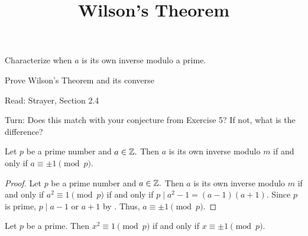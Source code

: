 \documentclass{ximera}
\title{Wilson's Theorem}
\begin{document}
\begin{abstract}
\end{abstract}
\maketitle


\begin{obj}
    \item Characterize when $a$ is its own inverse modulo a prime.

    \item Prove Wilson's Theorem and its converse
\end{obj}

\begin{pre}
    \item[Read:] Strayer, Section 2.4

    \item[Turn:]
    Does this match with your conjecture from Exercise 5? If not, what is the difference?
\end{pre}




\begin{lemma}\label{lem:sqrt1}
    Let $p$ be a prime number and $a\in\mathbb Z.$ Then $a$ is its own inverse modulo $m$ if and only if $a\equiv \pm 1\pmod{p}.$
\end{lemma}

\begin{proof}
    Let $p$ be a prime number and $a\in\mathbb Z.$ Then $a$ is its own inverse modulo $m$ if and only if $a^2\equiv 1 \pmod{p}$ if and only if $p\mid a^2-1=(a-1)(a+1).$ Since $p$ is prime, $p\mid a-1$ or $a+1$ by . Thus, $a\equiv\pm 1\pmod p.$
\end{proof}

\begin{corollary}\label{cor:sqrt1}
    Let $p$ be a prime. Then $x^2\equiv 1\pmod{p}$ if and only if $x\equiv \pm 1\pmod{p}.$
\end{corollary}
\end{document}
